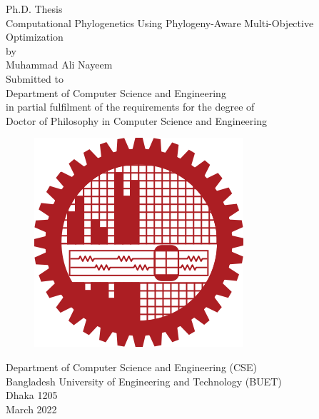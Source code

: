 \begin{titlepage}
\centering 
 {\sc \Large Ph.D. Thesis} \\
 \vspace{1 cm}
 {\huge Computational Phylogenetics Using Phylogeny-Aware Multi-Objective Optimization}\\
 \vspace{0.5 cm}
 {\Large by \\
 Muhammad Ali Nayeem}\\
 \vspace{3cm}
 {\Large Submitted to}\\
 {\Large Department of Computer Science and Engineering\\
 in partial fulfilment of the requirements for the degree of \\
 Doctor of Philosophy in Computer Science and Engineering} \\
 \vspace{1cm}
 \begin{figure}[h] 
 \centering
 \includegraphics[scale=0.2]{Figure/buet_logo}
 \end{figure}
 \vspace{0.4cm}
 {\Large Department of Computer Science and Engineering (CSE)\\
 	Bangladesh University of Engineering and Technology (BUET)\\
 	Dhaka 1205 \\
 }
 \vspace{0.5cm}
 {\Large March 2022}
\end{titlepage}
 \newpage
 
